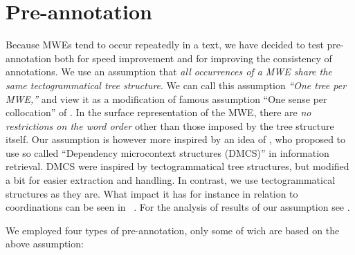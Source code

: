 \section{Pre-annotation}
\label{sec:annot:pre}
Because MWEs tend to occur repeatedly in a text, we have decided to test pre-annotation both for speed improvement and for improving the consistency of annotations. 
We use an assumption that \emph{all occurrences of a MWE share the same tectogrammatical tree structure}. We can call this assumption \emph{``One tree per MWE,''} and view it as a modification of famous assumption ``One sense per collocation'' of \citet{yarowsky:1993}. In the surface representation of the MWE, there are \emph{no restrictions on the word order} other than those imposed by the tree structure itself. Our assumption is however more inspired by an idea of \citet{holub-bohmova:2000:RANLPIR}, who proposed to use so called ``Dependency microcontext structures (DMCS)'' in information retrieval. DMCS were inspired by tectogrammatical tree structures, but modified a bit for easier extraction and handling. In contrast, we use tectogrammatical structures as they are. What impact it has for instance in relation to coordinations can be seen in \todo\ \Sref{}. For the analysis of results of our assumption see \todo.

We employed four types of pre-annotation, only some of wich are based on the above assumption:

